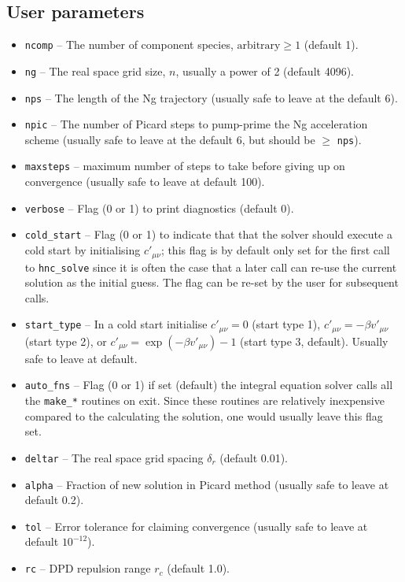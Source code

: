 \documentclass[12pt,a4paper]{article}
\begin{document}
\subsection{User parameters}
%
\begin{itemize}
%
\item\verb+ncomp+ -- The number of component species, $\text{arbitrary}\ge
  1$ (default 1).
%
\item\verb+ng+ -- The real space grid size, $n$, usually a power of 2
  (default 4096).
%
\item\verb+nps+ -- The length of the Ng trajectory (usually safe to
  leave at the default 6).
%
\item\verb+npic+ -- The number of Picard steps to pump-prime the Ng
  acceleration scheme (usually safe to leave at the default 6, but
  should be $\ge$ \verb+nps+).
%
\item\verb+maxsteps+ -- maximum number of steps to take before giving up on
convergence (usually safe to leave at default 100).
%
\item\verb+verbose+ -- Flag (0 or 1) to print diagnostics (default 0).
%
\item\verb+cold_start+ -- Flag (0 or 1) to indicate that that the
  solver should execute a cold start by initialising $c'_{\mu\nu}$;
  this flag is by default only set for the first call to
  \verb+hnc_solve+ since it is often the case that a later call
  can re-use the current solution as the initial guess.  The flag
  can be re-set by the user for subsequent calls.
%
\item\verb+start_type+ -- In a cold start initialise $c'_{\mu\nu}=0$
  (start type 1), $c'_{\mu\nu}=-\beta v'_{\mu\nu}$ (start type 2), or
  $c'_{\mu\nu}=\exp(-\beta v'_{\mu\nu})-1$ (start type 3, default).
  Usually safe to leave at default.
%
\item\verb+auto_fns+ -- Flag (0 or 1) if set (default) the integral
  equation solver calls all the \verb+make_*+ routines on exit.
  Since these routines are relatively inexpensive compared to the
  calculating the solution, one would usually leave this flag set.
%
\item\verb+deltar+ -- The real space grid spacing $\delta_r$ (default 0.01).
%
\item\verb+alpha+ -- Fraction of new solution in Picard method
  (usually safe to leave at default 0.2).
%
\item\verb+tol+ -- Error tolerance for claiming convergence (usually
  safe to leave at default $10^{-12}$).
%
\item\verb+rc+ -- DPD repulsion range $r_c$ (default 1.0).

\end{itemize}
\end{document}
